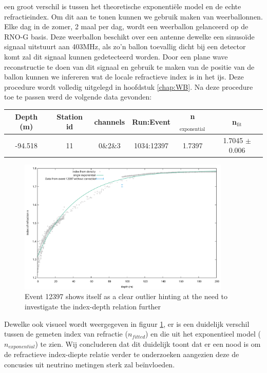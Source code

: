een groot verschil is tussen het theoretische exponentiële model en de echte refractieindex. Om dit aan te tonen 
kunnen we gebruik maken van weerballonnen. Elke dag in de zomer, 2 maal per dag, wordt een weerballon gelanceerd 
op de RNO-G basis. 
Deze weerballon beschikt over een antenne dewelke een sinusoïde signaal uitstuurt aan 403MHz, als zo'n ballon toevallig
dicht bij een detector komt zal dit signaal kunnen gedetecteerd worden. Door een plane wave reconstructie te doen
van dit signaal en gebruik te maken van de positie van de ballon kunnen we infereren wat de locale refractieve index
is in het ijs. Deze procedure wordt volledig uitgelegd in hoofdstuk \ref{chap:WB}.
Na deze procedure toe te passen werd de volgende data gevonden:
\begin{center}
\begin{tabular}{||c c c c c c||}
 \hline
 Depth (m) & Station id & channels & Run:Event & n$_\text{exponential}$ & n$_\text{fit}$\\ [0.5ex]
 \hline\hline
 -94.518 & 11 & 0\&2\&3 & 1034:12397 & 1.7397 & 1.7045 $\pm$ 0.006 \\
 \hline
\end{tabular}
\end{center}
\begin{figure}
	\centering
	\includegraphics[width=0.9\textwidth]{figures/Event12397NoCorr.pdf}
  \caption{Event 12397 shows itself as a clear outlier hinting at the need to investigate the index-depth relation further}
  \label{fig:SamFinRes}
\end{figure}
Dewelke ook visueel wordt weergegeven in figuur \ref{fig:SamFinRes}, er is een
duidelijk verschil tussen de gemeten index van refractie ($n_{fitted}$) en die
uit het exponentieel model ($n_{exponential}$) te zien.
Wij concluderen dat dit duidelijk toont dat er een nood is om de refractieve index-diepte
relatie verder te onderzoeken aangezien deze de concusies uit neutrino metingen sterk
zal beïnvloeden.
\newpage
